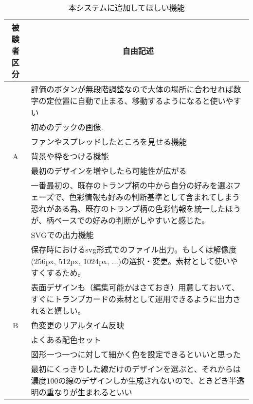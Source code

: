\begin{table}[htbp]
    \centering
    \caption{本システムに追加してほしい機能}
    \begin{tabular}{|c|p{29em}|} \hline
          被験者区分 & \multicolumn{1}{|c|}{自由記述}  \\ \hline
           & 評価のボタンが無段階調整なので大体の場所に合わせれば数字の定位置に自動で止まる、移動するようになると使いやすい \\\cline{2-2}
          　& 初めのデックの画像. \\\cline{2-2}
            & ファンやスプレッドしたところを見せる機能 \\\cline{2-2}
           A & 背景や枠をつける機能 \\\cline{2-2}
            & 最初のデザインを増やしたら可能性が広がる\\\cline{2-2}
            & 一番最初の、既存のトランプ柄の中から自分の好みを選ぶフェーズで、色彩情報も好みの判断基準として含まれてしまう恐れがある為、既存のトランプ柄の色彩情報を統一したほうが、柄ベースでの好みの判断がしやすいと感じた。\\ \hline
          & SVGでの出力機能 \\\cline{2-2}
                & 保存時におけるsvg形式でのファイル出力。もしくは解像度(256px, 512px, 1024px, ...)の選択・変更。素材として使いやすくするため。 \\\cline{2-2}
                & 表面デザインも（編集可能かはさておき）用意しておいて、すぐにトランプカードの素材として運用できるように出力されると嬉しい。 \\\cline{2-2}
               B & 色変更のリアルタイム反映 \\\cline{2-2}
                & よくある配色セット \\\cline{2-2}
                & 図形一つ一つに対して細かく色を設定できるといいと思った \\\cline{2-2}
                & 最初にくっきりした線だけのデザインを選ぶと、それからは濃度100の線のデザインしか生成されないので、ときどき半透明の重なりが生まれるといい \\ \hline
    \end{tabular}
    \label{free5}
\end{table}

